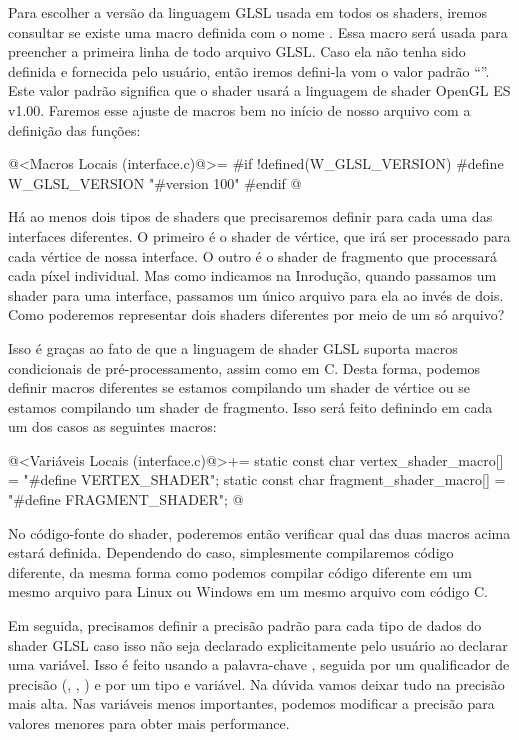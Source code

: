 Para escolher a versão da linguagem GLSL usada em todos os shaders,
iremos consultar se existe uma macro definida com o nome
. Essa macro será usada para preencher a
primeira linha de todo arquivo GLSL. Caso ela não tenha sido definida
e fornecida pelo usuário, então iremos defini-la vom o valor padrão
``''. Este valor padrão significa que o
shader usará a linguagem de shader OpenGL ES v1.00. Faremos esse
ajuste de macros bem no início de nosso arquivo com a definição das
funções:

\iniciocodigo
@<Macros Locais (interface.c)@>=
#if !defined(W_GLSL_VERSION)
#define W_GLSL_VERSION "#version 100\n"
#endif
@
\fimcodigo

Há ao menos dois tipos de shaders que precisaremos definir para cada
uma das interfaces diferentes. O primeiro é o shader de vértice, que
irá ser processado para cada vértice de nossa interface. O outro é o
shader de fragmento que processará cada píxel individual. Mas como
indicamos na Inrodução, quando passamos um shader para uma interface,
passamos um único arquivo para ela ao invés de dois. Como poderemos
representar dois shaders diferentes por meio de um só arquivo?

Isso é graças ao fato de que a linguagem de shader GLSL suporta macros
condicionais de pré-processamento, assim como em C. Desta forma,
podemos definir macros diferentes se estamos compilando um shader de
vértice ou se estamos compilando um shader de fragmento. Isso será
feito definindo em cada um dos casos as seguintes macros:

\iniciocodigo
@<Variáveis Locais (interface.c)@>+=
static const char vertex_shader_macro[] = "#define VERTEX_SHADER\n";
static const char fragment_shader_macro[] = "#define FRAGMENT_SHADER\n";
@
\fimcodigo

No código-fonte do shader, poderemos então verificar qual das duas
macros acima estará definida. Dependendo do caso, simplesmente
compilaremos código diferente, da mesma forma como podemos compilar
código diferente em um mesmo arquivo para Linux ou Windows em um mesmo
arquivo com código C.

Em seguida, precisamos definir a precisão padrão para cada tipo de
dados do shader GLSL caso isso não seja declarado explicitamente pelo
usuário ao declarar uma variável. Isso é feito usando a palavra-chave
, seguida por um qualificador de precisão
(, , ) e por um
tipo e variável. Na dúvida vamos deixar tudo na precisão mais
alta. Nas variáveis menos importantes, podemos modificar a precisão
para valores menores para obter mais performance.

